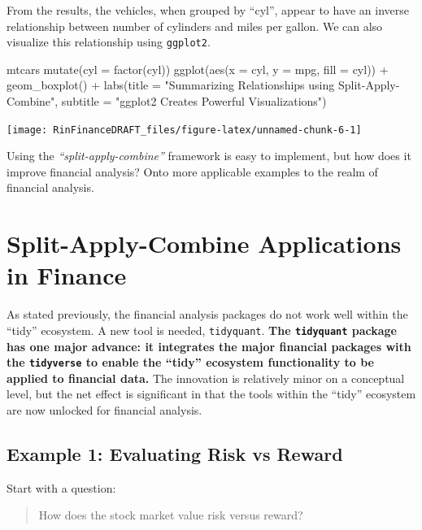 From the results, the vehicles, when grouped by ``cyl'', appear to have
an inverse relationship between number of cylinders and miles per
gallon. We can also visualize this relationship using \texttt{ggplot2}.

\begin{Schunk}
\begin{Sinput}
mtcars %
    mutate(cyl = factor(cyl)) %
    ggplot(aes(x = cyl, y = mpg, fill = cyl)) +
    geom_boxplot() +
    labs(title = "Summarizing Relationships using Split-Apply-Combine",
         subtitle = "ggplot2 Creates Powerful Visualizations")
\end{Sinput}


\begin{center}\texttt{[image: RinFinanceDRAFT\_files/figure-latex/unnamed-chunk-6-1]} \end{center}

\end{Schunk}

Using the \emph{``split-apply-combine''} framework is easy to implement,
but how does it improve financial analysis? Onto more applicable
examples to the realm of financial analysis.

\section{Split-Apply-Combine Applications in
Finance}\label{split-apply-combine-applications-in-finance}

As stated previously, the financial analysis packages do not work well
within the ``tidy'' ecosystem. A new tool is needed, \texttt{tidyquant}.
\textbf{The \texttt{tidyquant} package has one major advance: it
integrates the major financial packages with the \texttt{tidyverse} to
enable the ``tidy'' ecosystem functionality to be applied to financial
data.} The innovation is relatively minor on a conceptual level, but the
net effect is significant in that the tools within the ``tidy''
ecosystem are now unlocked for financial analysis.

\subsection{Example 1: Evaluating Risk vs
Reward}\label{example-1-evaluating-risk-vs-reward}

Start with a question:

\begin{quote}
How does the stock market value risk versus reward?
\end{quote}

